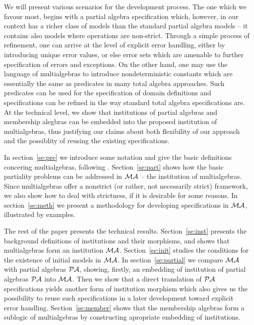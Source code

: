 \documentclass[10pt]{article}
\begin{document}
We will present various scenarios for the development process. The one which
we favour most, begins with a partial algebra specification which, however,
in our context has a richer class of models than the standard partial algebra
models -- it contains also models where operations are non-strict. Through a
simple process of refinement, one can arrive at the level of explicit error
handling, either by introducing unique error values, or else error sets which
are amenable to further specification of errors and exceptions. 
On the other hand, one may use the language of multialgebras to introduce
nondeterministic constants which are essentially the same as predicates in many
total algebra approaches. Such predicates can be used for the specification
of domain definitions and specifications can be refined in the way standard
total algebra specifications are. At the technical level, we show that
institutions of partial algebras and membership alegbras can be embedded into
the proposed institution of multialgebras, thus justifying our claims about
both flexibility of our approach and the possiblity of reusing the existing
specifications.

In section~\ref{se:pre} we introduce some notation and give the basic
definitions concering multialgebras, following \cite{multi}.
Section~\ref{se:part} shows how the basic partiality problems can be
addressed in ${\mathcal{MA}}$ -- the institution of multialgebras.  Since
multialgebras offer a nonstrict (or rather, not necessarily strict)
framework, we also show how to deal with strictness, if it is desirable for
some reasons.  In section~\ref{se:meth} we present a methodology for
developing specifications in ${\mathcal{MA}}$, illustrated by examples.

The rest of the paper presents the technical results.  Section~\ref{se:inst}
presents the background definitions of institutions \cite{inst} and their
morphisms, and shows that multialgebras form an institution
${\mathcal{MA}}$. Section~\ref{se:init} studies the conditions for the existence
of initial models in ${\mathcal{MA}}$. In section~\ref{se:partial} we compare
${\mathcal{MA}}$ with partial algebras ${\mathcal{PA}}$, showing, firstly, an embedding
of institution of partial algebras ${\mathcal{PA}}$ into ${\mathcal{MA}}$. Then we show
that a direct translation of ${\mathcal{PA}}$ specifications yields another form
of institution morphism which also gives us the possibility to reuse such
specifications in a later development toward explicit error handling.
Section~\ref{se:member} shows that the membership algebras \cite{member} form
a sublogic of multialgebras by constructing apropriate embedding
of institutions.
\end{document}
